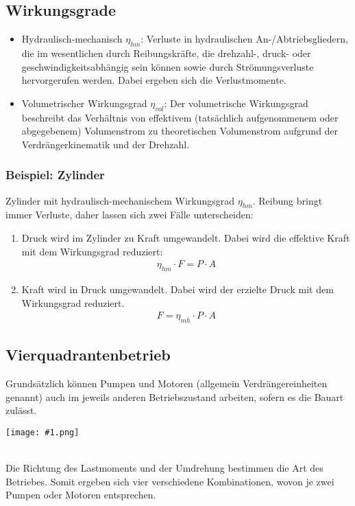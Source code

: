 \documentclass[landscape,a4paper,10pt]{article}
\newcommand{\graphiccol}[1]{
\noindent
\begin{minipage}{\columnwidth}
\centering
\texttt{[image: \#1.png]}
\end{minipage}
\medskip \\
}
\begin{document}
\begin{multicols*}{3}
\subsection{Wirkungsgrade}
\begin{itemize}
\item Hydraulisch-mechanisch $\eta_{hm}$: Verluste in hydraulischen An-/Abtriebsgliedern, die im wesentlichen durch Reibungskräfte, die drehzahl-, druck- oder geschwindigkeitsabhängig sein können sowie durch Strömungsverluste hervorgerufen werden. Dabei ergeben sich die Verlustmomente.
\item Volumetrischer Wirkungsgrad $\eta_{vol}$: Der volumetrische Wirkungsgrad beschreibt das Verhältnis von effektivem (tatsächlich aufgenommenem oder abgegebenem) Volumenstrom zu theoretischen Volumenstrom aufgrund der Verdrängerkinematik und der Drehzahl.
\end{itemize}

\subsubsection{Beispiel: Zylinder}
Zylinder mit hydraulisch-mechanischem Wirkungsgrad $\eta_{hm}$. Reibung bringt immer Verluste, daher lassen sich zwei Fälle unterscheiden:
\begin{enumerate}
\item Druck wird im  Zylinder zu Kraft umgewandelt. Dabei wird die effektive Kraft  mit dem Wirkungsgrad reduziert:
\begin{align*}
\eta_{hm} \cdot F = P \cdot A  
\end{align*}
\item Kraft wird in Druck umgewandelt. Dabei wird der erzielte Druck mit dem Wirkungsgrad reduziert.
\begin{align*}
F = \eta_{mh} \cdot P \cdot A
\end{align*}
\end{enumerate}

\subsection{Vierquadrantenbetrieb}
Grundsätzlich können Pumpen und Motoren (allgemein Verdrängereinheiten genannt) auch im jeweils anderen Betriebszustand arbeiten, sofern es die Bauart zulässt.
\graphiccol{vierquadrantenbetrieb}
Die Richtung des Lastmoments und der Umdrehung bestimmen die Art des Betriebes. Somit ergeben sich vier verschiedene Kombinationen, wovon je zwei Pumpen oder Motoren entsprechen.






\end{multicols*}
\end{document}
